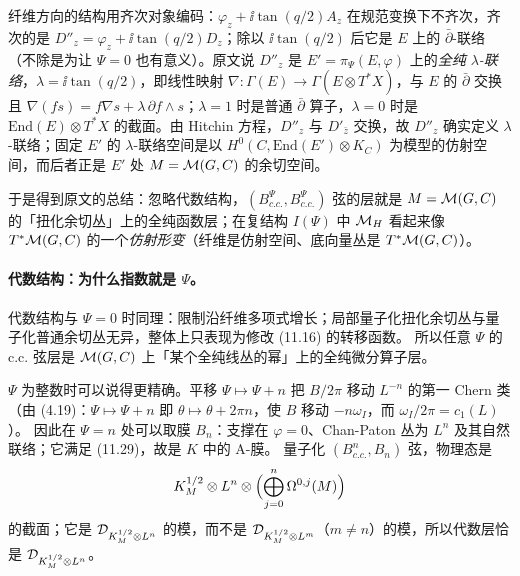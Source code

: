 纤维方向的结构用齐次对象编码：\(\varphi_z+\ii\tan(q/2)A_z\) 在规范变换下不齐次，齐次的是 \(D''_z=\varphi_z+\ii\tan(q/2)D_z\)；除以 \(\ii\tan(q/2)\) 后它是 \(E\) 上的 \(\bar\partial\)-联络（不除是为让 \(\Psi=0\) 也有意义）。原文说 \(D''_z\) 是 \(E'=\pi_\Psi(E,\varphi)\) 上的\emph{全纯 \(\lambda\)-联络}，\(\lambda=\ii\tan(q/2)\)，即线性映射 \(\nabla:\Gamma(E)\to\Gamma(E\otimes T^*X)\)，与 \(E\) 的 \(\bar\partial\) 交换且 \(\nabla(fs)=f\nabla s+\lambda\,\partial f\wedge s\)；\(\lambda=1\) 时是普通 \(\bar\partial\) 算子，\(\lambda=0\) 时是 \(\mathrm{End}(E)\otimes T^*X\) 的截面。由 Hitchin 方程，\(D''_z\) 与 \(D'_{\bar z}\) 交换，故 \(D''_z\) 确实定义 \(\lambda\)-联络；固定 \(E'\) 的 \(\lambda\)-联络空间是以 \(H^0(C,\mathrm{End}(E')\otimes K_C)\) 为模型的仿射空间，而后者正是 \(E'\) 处 \(M=\mathcal{M}(G,C)\) 的余切空间。\pA{}

于是得到原文的总结：忽略代数结构，\((B_{c.c.}^{\Psi},B_{c.c.}^{\Psi})\) 弦的层就是 \(M=\mathcal{M}(G,C)\) 的「扭化余切丛」上的全纯函数层；在复结构 \(I(\Psi)\) 中 \(\mathcal{M}_H\) 看起来像 \(T^*\mathcal{M}(G,C)\) 的一个\emph{仿射形变}（纤维是仿射空间、底向量丛是 \(T^*\mathcal{M}(G,C)\)）。\pA{}

\paragraph{代数结构：为什么指数就是 \(\Psi\)。}代数结构与 \(\Psi=0\) 时同理：限制沿纤维多项式增长；局部量子化扭化余切丛与量子化普通余切丛无异，整体上只表现为修改 (11.16) 的转移函数。\pA{} 所以任意 \(\Psi\) 的 c.c. 弦层是 \(\mathcal{M}(G,C)\) 上「某个全纯线丛的幂」上的全纯微分算子层。\pA{}

\(\Psi\) 为整数时可以说得更精确。平移 \(\Psi\mapsto\Psi+n\) 把 \(B/2\pi\) 移动 \(L^{-n}\) 的第一 Chern 类（由 (4.19)：\(\Psi\mapsto\Psi+n\) 即 \(\theta\mapsto\theta+2\pi n\)，使 \(B\) 移动 \(-n\omega_I\)，而 \(\omega_I/2\pi=c_1(L)\)）。\pA{} 因此在 \(\Psi=n\) 处可以取膜 \(B_n\)：支撑在 \(\varphi=0\)、Chan-Paton 丛为 \(L^n\) 及其自然联络；它满足 (11.29)，故是 \(K\) 中的 A-膜。\pA{} 量子化 \((B_{c.c.}^n,B_n)\) 弦，物理态是
\begin{equation}
K_M^{1/2}\otimes L^n\otimes\Bigl(\bigoplus_{j=0}^{n}\Omega^{0,j}(M)\Bigr)
\label{eq:states-n}
\end{equation}
的截面；它是 \(\mathcal{D}_{K_M^{1/2}\otimes L^n}\) 的模，而不是 \(\mathcal{D}_{K_M^{1/2}\otimes L^m}\)（\(m\neq n\)）的模，所以代数层恰是 \(\mathcal{D}_{K_M^{1/2}\otimes L^n}\)。\pA{}

